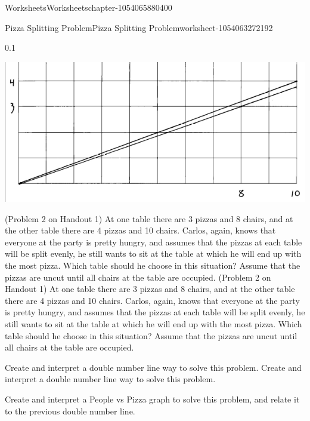 \documentclass[twoside,11pt,]{book}
\begin{document}
\begin{chapterptx}{Worksheets}{}{Worksheets}{}{}{chapter-1054065880400}
\begin{worksheet-section-numberless}{Pizza Splitting Problem}{}{Pizza Splitting Problem}{}{}{worksheet-1054063272192}
\begin{divisionexercise}{4}{}{0.1}
\begin{sidebyside}{1}{0.05}{0.05}{0}
\begin{sbspanel}{0.9}%
\includegraphics[width=1\linewidth]{images/pizza-splitting-problem.png}
\end{sbspanel}%
\end{sidebyside}%
\end{divisionexercise}%
\begin{divisionexercise}{5}{}{}{
        (Problem 2 on Handout 1) At one table there are 3 pizzas and 8 chairs, and at the other table there are 4 pizzas and 10 chairs.  Carlos, again, knows that everyone at the party is pretty hungry, and assumes that the pizzas at each table will be split evenly, he still wants to sit at the table at which he will end up with the most pizza.  Which table should he choose in this situation? Assume that the pizzas are uncut until all chairs at the table are occupied.
      }%
\hypertarget{p-1054066834768}{}%
(Problem 2 on Handout 1) At one table there are 3 pizzas and 8 chairs, and at the other table there are 4 pizzas and 10 chairs.  Carlos, again, knows that everyone at the party is pretty hungry, and assumes that the pizzas at each table will be split evenly, he still wants to sit at the table at which he will end up with the most pizza.  Which table should he choose in this situation? Assume that the pizzas are uncut until all chairs at the table are occupied.%
\end{divisionexercise}%
\begin{divisionexercise}{6}{}{}{
        Create and interpret a double number line way to solve this problem.
      }%
\hypertarget{p-1054066930480}{}%
Create and interpret a double number line way to solve this problem.%
\end{divisionexercise}%
\begin{divisionexercise}{7}{}{}{
        Create and interpret a People vs Pizza graph to solve this problem, and relate it to the previous double number line.
      }%
\hypertarget{p-1054066921904}{}%

\end{divisionexercise}
\end{worksheet-section-numberless}
\end{chapterptx}
\end{document}
